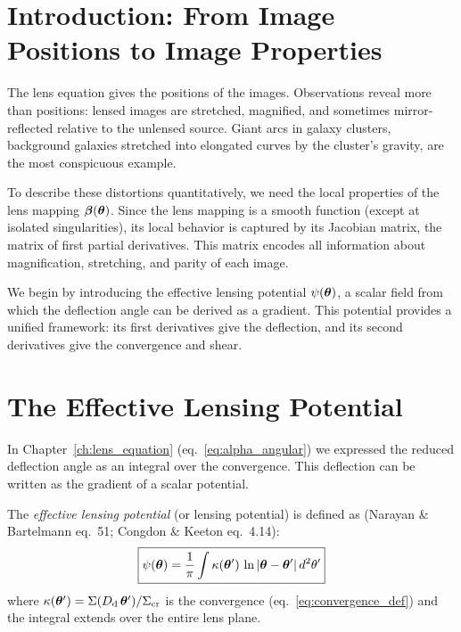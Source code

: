 \section{Introduction: From Image Positions to Image Properties}
\label{sec:mag_intro}

The lens equation gives the positions of the images.  Observations
reveal more than positions: lensed images are stretched, magnified, and
sometimes mirror-reflected relative to the unlensed source.  Giant arcs
in galaxy clusters, background galaxies stretched into elongated curves
by the cluster's gravity, are the most conspicuous example.

To describe these distortions quantitatively, we need the local
properties of the lens mapping
$\boldsymbol{\beta}(\boldsymbol{\theta})$.  Since the lens mapping is a smooth function
(except at isolated singularities), its local behavior is captured by
its Jacobian matrix, the matrix of first partial
derivatives.  This matrix encodes all information about magnification,
stretching, and parity of each image.

We begin by introducing the effective lensing potential
$\psi(\boldsymbol{\theta})$, a scalar field from which the deflection angle
can be derived as a gradient.  This potential provides a unified
framework: its first derivatives give the deflection, and its second
derivatives give the convergence and shear.


\section{The Effective Lensing Potential}
\label{sec:lensing_potential}

In Chapter~\ref{ch:lens_equation} (eq.~\ref{eq:alpha_angular}) we
expressed the reduced deflection angle as an integral over the
convergence.  This deflection can be written as the
gradient of a scalar potential.

\begin{definition}
The \emph{effective lensing potential} (or lensing
potential) is defined as
(Narayan \& Bartelmann eq.~51; Congdon \& Keeton eq.~4.14):
\begin{equation}
    \boxed{
    \psi(\boldsymbol{\theta}) = \frac{1}{\pi}
    \int \kappa(\boldsymbol{\theta}')\,
    \ln|\boldsymbol{\theta} - \boldsymbol{\theta}'|\, d^2\theta'
    }
    \label{eq:lensing_potential}
\end{equation}
where $\kappa(\boldsymbol{\theta}') = \Sigma(D_{\mathrm{d}}\,\boldsymbol{\theta}')/\Sigma_{\mathrm{cr}}$ is
the convergence (eq.~\ref{eq:convergence_def}) and the integral
extends over the entire lens plane.
\end{definition}

